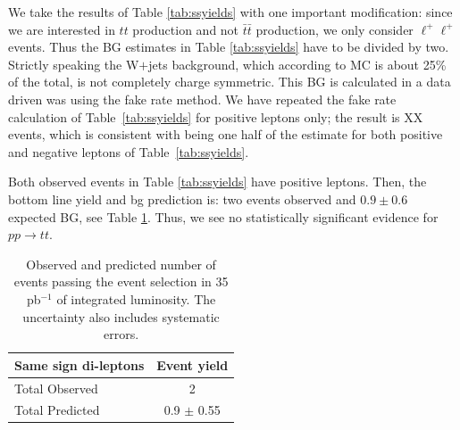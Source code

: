 We take the results of Table \ref{tab:ssyields} with one important modification: 
since we are interested in $tt$ production and not $\bar{t}\bar{t}$ production,
we only consider $\ell^{+}\ell^{+}$ events.  
Thus the BG estimates in Table \ref{tab:ssyields} have to be divided by two.
Strictly speaking the W$+$jets background, which according to MC is about 25\%
of the total, is not completely charge symmetric.  This BG is calculated in a data 
driven was using the fake rate method.  We have repeated the fake rate calculation
of Table~\ref{tab:ssyields} for positive leptons only; the result is 
XX events, which is consistent with being one half of the estimate for both
positive and negative leptons of Table~\ref{tab:ssyields}.


Both observed events in Table \ref{tab:ssyields} have positive leptons.  
Then, the bottom line yield and bg prediction is: 
two events observed and $0.9 \pm 0.6$ expected BG, see Table \ref{tab:sm_preditcion}.
Thus, we see no statistically significant evidence for $pp \to tt$.







\begin{table}[hbt]
\begin{center}
\begin{tabular}{|l|c|}\hline
Same sign di-leptons & Event yield \\ \hline
Total Observed & 2 \\
Total Predicted & 0.9 $\pm$ 0.55 \\
\hline
\end{tabular}
\caption{ Observed and predicted number of events passing the event selection in 35 pb$^{-1}$ of integrated luminosity. 
The uncertainty also includes systematic errors.\label{tab:sm_preditcion}}
\end{center}
\end{table}

